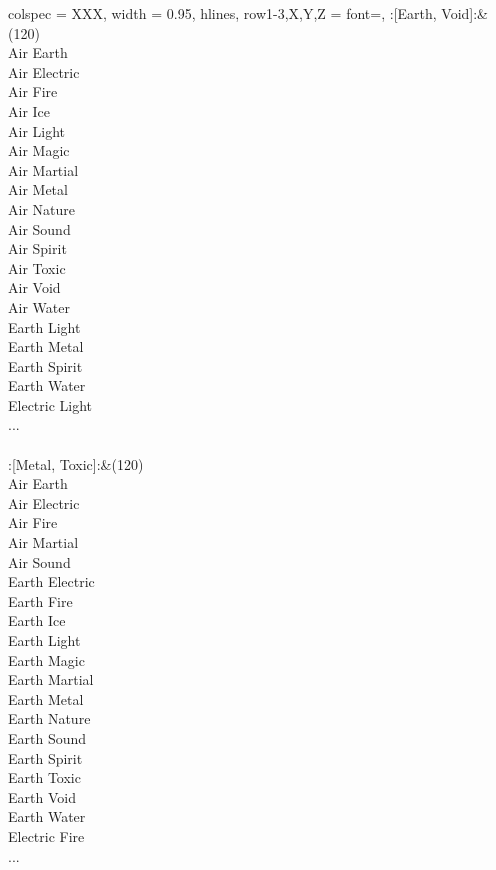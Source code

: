 \begin{longtblr}[
	caption = {2v2 Defending Weak},
	label = {2v2-Defending-Weak},
]{
	colspec = {XXX}, width = 0.95\linewidth,
	hlines,
	row{1-3,X,Y,Z} = {font=\bfseries},
}
	:[Earth, Void]:&{(120)\\
	Air Earth \\
	Air Electric \\
	Air Fire \\
	Air Ice \\
	Air Light \\
	Air Magic \\
	Air Martial \\
	Air Metal \\
	Air Nature \\
	Air Sound \\
	Air Spirit \\
	Air Toxic \\
	Air Void \\
	Air Water \\
	Earth Light \\
	Earth Metal \\
	Earth Spirit \\
	Earth Water \\
	Electric Light \\
	...\\
	}\\

	:[Metal, Toxic]:&{(120)\\
	Air Earth \\
	Air Electric \\
	Air Fire \\
	Air Martial \\
	Air Sound \\
	Earth Electric \\
	Earth Fire \\
	Earth Ice \\
	Earth Light \\
	Earth Magic \\
	Earth Martial \\
	Earth Metal \\
	Earth Nature \\
	Earth Sound \\
	Earth Spirit \\
	Earth Toxic \\
	Earth Void \\
	Earth Water \\
	Electric Fire \\
	...\\
	}\\


\end{longtblr}
